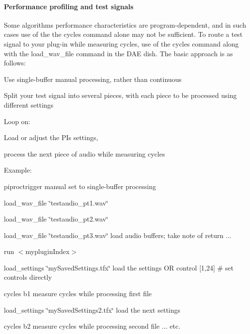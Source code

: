 \hypertarget{a00835_subsubsection__performance_profiling_and_test_signals_}{}\paragraph{Performance profiling and test signals}\label{a00835_subsubsection__performance_profiling_and_test_signals_}
 Some algorithms\textquotesingle{} performance characteristics are program-\/dependent, and in such cases use of the the cycles command alone may not be sufficient. To route a test signal to your plug-\/in while measuring cycles, use of the cycles command along with the {\ttfamily load\+\_\+wav\+\_\+file} command in the D\+AE dish. The basic approach is as follows\+: 
\begin{DoxyItemize}
\item Use single-\/buffer manual processing, rather than continuous  
\item Split your test signal into several pieces, with each piece to be processed using different settings  
\item Loop on\+: 
\begin{DoxyItemize}
\item Load or adjust the PI\textquotesingle{}s settings,  
\item process the next piece of audio while measuring cycles  
\end{DoxyItemize}
\end{DoxyItemize}

Example\+: 
\begin{DoxyEnumerate}
\item {\ttfamily piproctrigger manual}  set to single-\/buffer processing   
\item {\ttfamily load\+\_\+wav\+\_\+file \char`\"{}testaudio\+\_\+pt1.\+wav\char`\"{}}  
\item {\ttfamily load\+\_\+wav\+\_\+file \char`\"{}testaudio\+\_\+pt2.\+wav\char`\"{}}  
\item {\ttfamily load\+\_\+wav\+\_\+file \char`\"{}testaudio\+\_\+pt3.\+wav\char`\"{}}  load audio buffers; take note of return ...  
\item {\ttfamily run $<$myplugin\+Index$>$} 
\item {\ttfamily load\+\_\+settings \char`\"{}my\+Saved\+Settings.\+tfx\char`\"{} }  load the settings  OR  {\ttfamily control \mbox{[}1,24\mbox{]} }\# set controls directly   
\item {\ttfamily cycles b1}  measure cycles while processing first file  
\item {\ttfamily load\+\_\+settings \char`\"{}my\+Saved\+Settings2.\+tfx\char`\"{}}  load the next settings  
\item {\ttfamily cycles b2}  measure cycles while processing second file  ... etc.   
\end{DoxyEnumerate}

